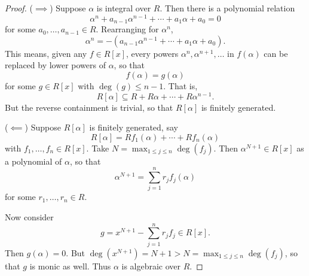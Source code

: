 \documentclass[pmath441]{subfiles}
\begin{document}
    \begin{proof}
        ($\implies$) Suppose $\alpha$ is integral over $R$. Then there is a polynomial relation
        \begin{equation*}
            \alpha^n + a_{n-1}\alpha^{n-1} + \cdots + a_1\alpha + a_0 = 0
        \end{equation*}
        for some $a_0,\ldots,a_{n-1}\in R$. Rearranging for $\alpha^n$,
        \begin{equation*}
            \alpha^n = - \left( a_{n-1}\alpha^{n-1} + \cdots + a_1\alpha + a_0 \right).
        \end{equation*}
        This means, given any $f\in R\left[ x \right]$, every powers $\alpha^n,\alpha^{n+1},\ldots$ in $f\left( \alpha \right)$ can be replaced by lower powers of $\alpha$, so that
        \begin{equation*}
            f\left( \alpha \right) = g\left( \alpha \right)
        \end{equation*}
        for some $g\in R\left[ x \right]$ with $\deg\left( g \right) \leq n-1$. That is,
        \begin{equation*}
            R\left[ \alpha \right]\subseteq R+R\alpha+\cdots+R\alpha^{n-1}.
        \end{equation*}
        But the reverse containment is trivial, so that $R\left[ \alpha \right]$ is finitely generated.

        ($\impliedby$) Suppose $R\left[ \alpha \right]$ is finitely generated, say
        \begin{equation*}
            R\left[ \alpha \right] = Rf_1\left( \alpha \right) + \cdots + Rf_n\left( \alpha \right)
        \end{equation*}
        with $f_1,\ldots,f_n\in R\left[ x \right]$. Take $N = \max_{1\leq j\leq n} \deg\left( f_j \right)$. Then $\alpha^{N+1}\in R\left[ x \right]$ as a polynomial of $\alpha$, so that
        \begin{equation*}
            \alpha^{N+1} = \sum^{n}_{j=1} r_jf_j\left( \alpha \right)
        \end{equation*}
        for some $r_1,\ldots,r_n\in R$. 

        Now consider
        \begin{equation*}
            g = x^{N+1} - \sum^{n}_{j=1}r_jf_j \in R\left[ x \right].
        \end{equation*}
        Then $g\left( \alpha \right) = 0$. But $\deg\left( x^{N+1} \right) = N+1 > N = \max_{1\leq j\leq n} \deg\left( f_j \right)$, so that $g$ is monic as well. Thus $\alpha$ is algebraic over $R$.
    \end{proof}
    
\end{document}
